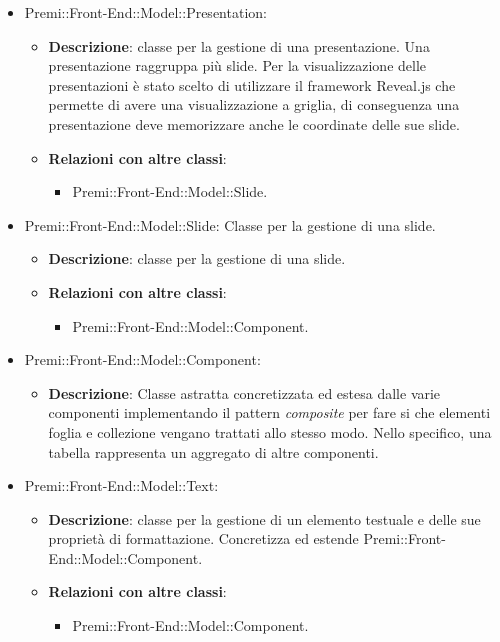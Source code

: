 \begin{itemize}
		 \item Premi::Front-End::Model::Presentation:
			\begin{itemize}
				\item \textbf{Descrizione}: classe per la gestione di una presentazione. Una presentazione raggruppa più slide. Per la visualizzazione delle presentazioni è stato scelto di utilizzare il framework Reveal.js che permette di avere una visualizzazione a griglia, di conseguenza una presentazione deve memorizzare anche le coordinate delle sue slide.
				\item \textbf{Relazioni con altre classi}:
				\begin{itemize}
					\item Premi::Front-End::Model::Slide.
				\end{itemize}
			\end{itemize}

		 \item Premi::Front-End::Model::Slide: Classe per la gestione di una slide.
			\begin{itemize}
				\item \textbf{Descrizione}: classe per la gestione di una slide.
				\item \textbf{Relazioni con altre classi}:
				\begin{itemize}
					\item Premi::Front-End::Model::Component.
				\end{itemize}
			\end{itemize}
			
		 \item Premi::Front-End::Model::Component: 
			\begin{itemize}
				\item \textbf{Descrizione}: Classe astratta concretizzata ed estesa dalle varie componenti implementando il pattern \textit{composite} per fare si che elementi foglia e collezione vengano trattati allo stesso modo. Nello specifico, una tabella rappresenta un aggregato di altre componenti.
			\end{itemize}
			
		 \item Premi::Front-End::Model::Text:
			\begin{itemize}
				\item \textbf{Descrizione}: classe per la gestione di un elemento testuale e delle sue proprietà di formattazione. Concretizza ed estende Premi::Front-End::Model::Component.
				\item \textbf{Relazioni con altre classi}:
				\begin{itemize}
					\item Premi::Front-End::Model::Component.
				\end{itemize}
			\end{itemize}
			

\end{itemize}
